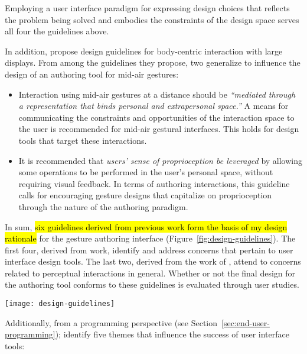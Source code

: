 Employing a user interface paradigm for expressing design choices that reflects the problem being solved and embodies the constraints of the design space \parencite{Norman:1993} serves all four the guidelines above.

In addition, \textcite{Shoemaker:2010} propose design guidelines for body-centric interaction with large displays. From among the guidelines they propose, two generalize to influence the design of an authoring tool for mid-air gestures:

\begin{itemize}
\item Interaction using mid-air gestures at a distance should be \emph{“mediated through a representation that binds personal and extrapersonal space.”} A means for communicating the constraints and opportunities of the interaction space to the user is recommended for mid-air gestural interfaces. This holds for design tools that target these interactions.
\item It is recommended that \emph{users’ sense of proprioception be leveraged} by allowing some operations to be performed in the user’s personal space, without requiring visual feedback. In terms of authoring interactions, this guideline calls for encouraging gesture designs that capitalize on proprioception through the nature of the authoring paradigm.
\end{itemize}

In sum, \hl{six guidelines derived from previous work form the basis of my design rationale} for the gesture authoring interface (Figure~\ref{fig:design-guidelines}). The first four, derived from  work, identify and address concerns that pertain to user interface design tools. The last two, derived from the work of \textcite{Shoemaker:2010}, attend to concerns related to perceptual interactions in general. Whether or not the final design for the authoring tool conforms to these guidelines is evaluated through user studies.

\begin{SCfigure}[\sidecaptionrelwidth][ht]
\centering
\texttt{[image: design-guidelines]}
\caption{Guidelines derived from the literature formed the basis of the design rationale for a gesture authoring tool.}
\label{fig:design-guidelines}
\end{SCfigure}

Additionally, from a programming perspective (see Section~\ref{sec:end-user-programming}); \textcite{Myers:2000} identify five themes that influence the success of user interface tools:

